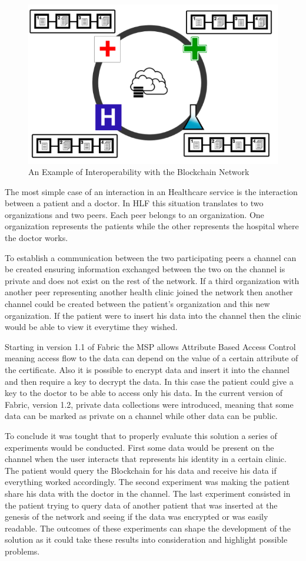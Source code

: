 \begin{figure}[ht] \centering
  \includegraphics[width=0.7\linewidth]{imgs/interoperability.png}
  \caption{\label{fig:interoperability}An Example of Interoperability with the
  Blockchain Network} 
\end{figure}

The most simple case of an interaction in an Healthcare service is the
interaction between a patient and a doctor. In HLF this situation translates to
two organizations and two peers. Each peer belongs to an organization. One
organization represents the patients while the other represents the hospital
where the doctor works. 

To establish a communication between the two participating peers a channel can
be created ensuring information exchanged between the two on the channel is
private and does not exist on the rest of the network.  If a third organization
with another peer representing another health clinic joined the network then
another channel could be created between the patient's organization and this
new organization. If the patient were to insert his data into the channel then
the clinic would be able to view it everytime they wished. 

Starting in version 1.1 of Fabric the MSP allows Attribute Based Access Control
meaning access flow to the data can depend on the value of a certain attribute
of the certificate. Also it is possible to encrypt data and insert it into the
channel and then require a key to decrypt the data. In this case the patient
could give a key to the doctor to be able to access only his data. In the
current version of Fabric, version 1.2, private data collections were
introduced, meaning that some data can be marked as private on a channel while
other data can be public.

To conclude it was tought that to properly evaluate this solution a series of
experiments would be conducted. First some data would be present on the channel
when the user interacts that represents his identity in a certain clinic. The
patient would query the Blockchain for his data and receive his data if
everything worked accordingly. The second experiment was making the patient
share his data with the doctor in the channel. The last experiment consisted in
the patient trying to query data of another patient that was inserted at the
genesis of the network and seeing if the data was encrypted or was easily
readable. The outcomes of these experiments can shape the development of the
solution as it could take these results into consideration and highlight
possible problems.

